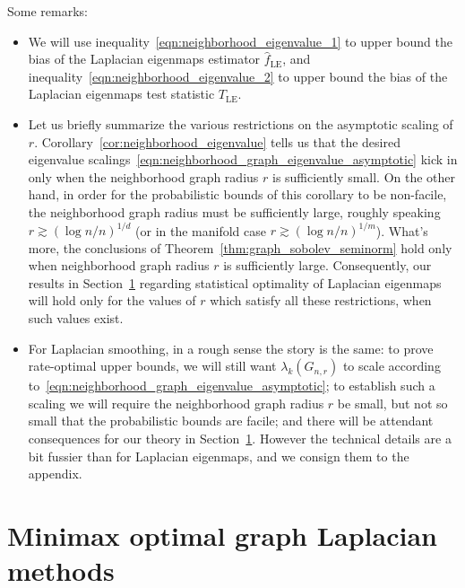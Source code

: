 \documentclass{article}
\newcommand{\1}{\mathbf{1}}
\newcommand{\wh}[1]{\widehat{#1}}
\newcommand{\LE}{\mathrm{LE}}
\theoremstyle{alden}
\theoremstyle{aldenthm}
\theoremstyle{definition}
\theoremstyle{remark}
\begin{document}
Some remarks:
\begin{itemize}
	\item We will use inequality~\eqref{eqn:neighborhood_eigenvalue_1} to upper bound the bias of the Laplacian eigenmaps estimator $\wh{f}_{\LE}$, and inequality~\eqref{eqn:neighborhood_eigenvalue_2} to upper bound the bias of the Laplacian eigenmaps test statistic $T_{\LE}$. 
	\item Let us briefly summarize the various restrictions on the asymptotic scaling of $r$. Corollary~\ref{cor:neighborhood_eigenvalue} tells us that the desired eigenvalue scalings~\eqref{eqn:neighborhood_graph_eigenvalue_asymptotic} kick in only when the neighborhood graph radius $r$ is sufficiently small. On the other hand, in order for the probabilistic bounds of this corollary to be non-facile, the neighborhood graph radius must be sufficiently large, roughly speaking $r \gtrsim (\log n/n)^{1/d}$ (or in the manifold case $r \gtrsim (\log n/n)^{1/m}$). What's more, the conclusions of Theorem~\ref{thm:graph_sobolev_seminorm} hold only when neighborhood graph radius $r$ is sufficiently large. Consequently, our results in Section~\ref{sec:minimax_optimal_graph_Laplacian_methods} regarding statistical optimality of Laplacian eigenmaps will hold only for the values of $r$ which satisfy all these restrictions, when such values exist.
	\item For Laplacian smoothing, in a rough sense the story is the same: to prove rate-optimal upper bounds, we will still want $\lambda_k(G_{n,r})$ to scale according to~\eqref{eqn:neighborhood_graph_eigenvalue_asymptotic}; to establish such a scaling we will require the neighborhood graph radius $r$ be small, but not so small that the probabilistic bounds are facile; and there will be attendant consequences for our theory in Section~\ref{sec:minimax_optimal_graph_Laplacian_methods}. However the technical details are a bit fussier than for Laplacian eigenmaps, and we consign them to the appendix.
\end{itemize}

\section{Minimax optimal graph Laplacian methods}
\label{sec:minimax_optimal_graph_Laplacian_methods}
\end{document}
